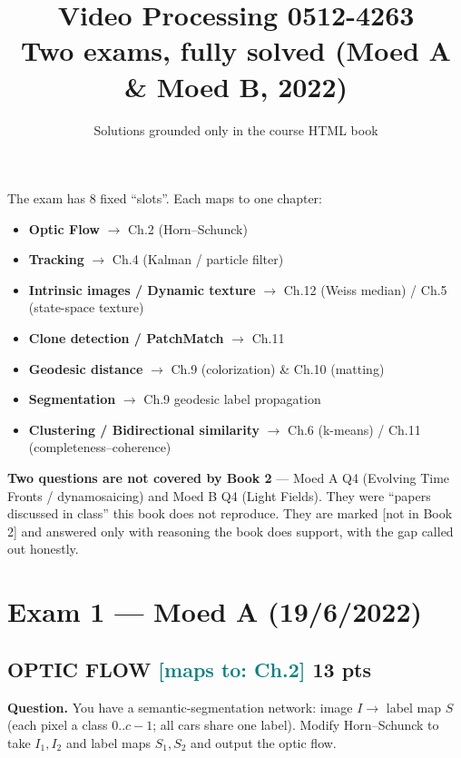 \documentclass[11pt]{article}
\title{\textbf{Video Processing 0512-4263}\\[2pt]\large Two exams, fully solved
  (Moed A \& Moed B, 2022)}
\author{Solutions grounded only in the course HTML book}
\date{}
\newcommand{\maps}[1]{{\small\textcolor{teal}{[maps to: #1]}}}
\newcommand{\mapsoob}[1]{{\small\textcolor{oob}{[#1]}}}
\begin{document}
\maketitle
\vspace{-1.2em}

\begin{tcolorbox}[colback=teal!5,colframe=teal!60!black,title=\textbf{How each question maps to the book}]
The exam has 8 fixed ``slots''. Each maps to one chapter:
\begin{itemize}
  \item \textbf{Optic Flow} $\to$ Ch.2 (Horn--Schunck)
  \item \textbf{Tracking} $\to$ Ch.4 (Kalman / particle filter)
  \item \textbf{Intrinsic images / Dynamic texture} $\to$ Ch.12 (Weiss median) / Ch.5 (state-space texture)
  \item \textbf{Clone detection / PatchMatch} $\to$ Ch.11
  \item \textbf{Geodesic distance} $\to$ Ch.9 (colorization) \& Ch.10 (matting)
  \item \textbf{Segmentation} $\to$ Ch.9 geodesic label propagation
  \item \textbf{Clustering / Bidirectional similarity} $\to$ Ch.6 (k-means) / Ch.11 (completeness--coherence)
\end{itemize}
\textbf{Two questions are not covered by Book 2} --- Moed A Q4 (Evolving Time Fronts / dynamosaicing) and
Moed B Q4 (Light Fields). They were ``papers discussed in class'' this book does not reproduce. They are marked
\mapsoob{not in Book 2} and answered only with reasoning the book does support, with the gap called out honestly.
\end{tcolorbox}

\section{Exam 1 --- Moed A (19/6/2022)}

\subsection{OPTIC FLOW \hfill \maps{Ch.2} \hfill \textnormal{\small 13 pts}}
\begin{qbox}\textbf{Question.} You have a semantic-segmentation network: image $I\to$ label map $S$ (each pixel a
class $0..c-1$; all cars share one label). Modify Horn--Schunck to take $I_1,I_2$ and label maps $S_1,S_2$ and
output the optic flow.\end{qbox}
\end{document}
